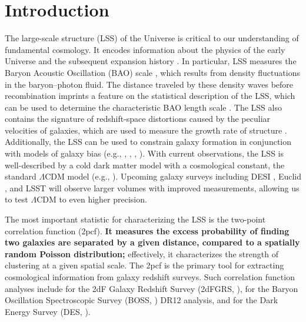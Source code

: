 \documentclass[modern]{aastex62}
\newcommand{\cf}{2pcf\xspace}
\newcommand{\new}[1]{\textbf{#1}}
\begin{document}
\section{Introduction}

The large-scale structure (LSS) of the Universe is critical to our understanding of fundamental cosmology. 
It encodes information about the physics of the early Universe and the subsequent expansion history \citep{SunyaevZeldovich1970, HuSugiyama1996, Riess1998}.
In particular, LSS measures the Baryon Acoustic Oscillation (BAO) scale \citep{Cole2005, Eisenstein2005}, which results from density fluctuations in the baryon--photon fluid.
The distance traveled by these density waves before recombination imprints a feature on the statistical description of the LSS, which can be used to determine the characteristic BAO length scale \citep{PeeblesYu1970, EisensteinHu1998}.
The LSS also contains the signature of redshift-space distortions caused by the peculiar velocities of galaxies, which are used to measure the growth rate of structure \citep{Kaiser1987}.
Additionally, the LSS can be used to constrain galaxy formation in conjunction with models of galaxy bias (e.g., \citealt{Hamilton1988},  \citealt{Li2006}, \citealt{Zehavi2011}, \citealt{Durkalec2018}).
With current observations, the LSS is well-described by a cold dark matter model with a cosmological constant, the standard $\Lambda$CDM model (e.g., \citealt{Alam2016}).
Upcoming galaxy surveys including DESI \citep{Aghamousa2016}, Euclid \citep{Laureijs2011}, and LSST \citep{Ivezic2018} will observe larger volumes with improved measurements, allowing us to test $\Lambda$CDM to even higher precision.

The most important statistic for characterizing the LSS is the two-point correlation function (\cf).
\new{It measures the excess probability of finding two galaxies are separated by a given distance, compared to a spatially random Poisson distribution;} effectively, it characterizes the strength of clustering at a given spatial scale.
The \cf is the primary tool for extracting cosmological information from galaxy redshift surveys.
Such correlation function analyses include \cite{Hawkins2003} for the 2dF Galaxy Redshift Survey (2dFGRS, \citealt{Colless2001}), \cite{Alam2016} for the Baryon Oscillation Spectroscopic Survey (BOSS, \citealt{Dawson2013}) DR12 analysis, and \cite{Elvin-Poole2017} for the Dark Energy Survey (DES, \citealt{DES2005}).
\end{document}

